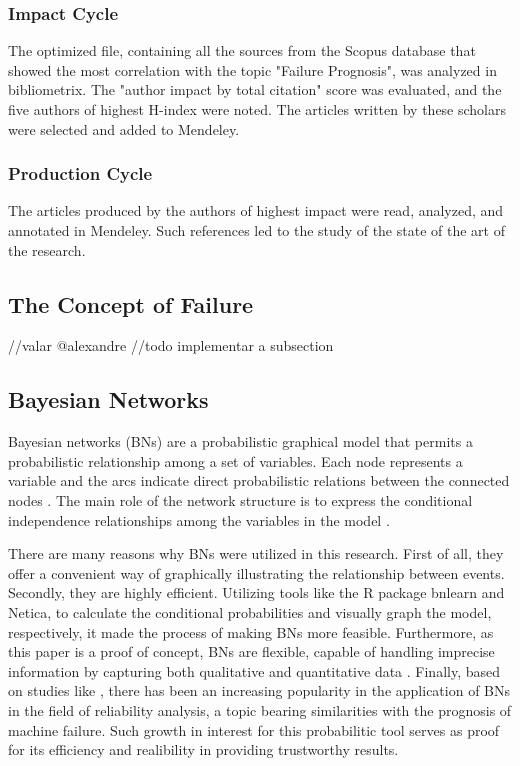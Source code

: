\subsubsection{Impact Cycle}
The optimized file, containing all the sources from the Scopus database that showed the most correlation with the topic "Failure Prognosis", was analyzed in bibliometrix. 
The "author impact by total citation" score was evaluated, and the five authors of highest H-index were noted. The articles written by these scholars were selected and added to Mendeley.

\subsubsection{Production Cycle}
The articles produced by the authors of highest impact were read, analyzed, and annotated in Mendeley.
Such references led to the study of the state of the art of the research.

\subsection{The Concept of Failure}
//valar @alexandre
//todo implementar a subsection


\subsection{Bayesian Networks}
Bayesian networks (BNs) are a probabilistic graphical model that  permits  a  probabilistic  relationship  among a set of variables.  Each  node  represents  a  variable  and  the  arcs  indicate  direct probabilistic  relations  between  the  connected  nodes \cite{hamza2015mapping}. The main role of the network structure is to express the conditional independence relationships among the variables in the model \cite{Understa77:online}.

There are many reasons why BNs were utilized in this research. First of all, they offer a convenient way of graphically illustrating the relationship between events. Secondly, they are highly efficient. Utilizing tools like the R package bnlearn and Netica, to calculate the conditional probabilities and visually graph the model, respectively, it made the process of making BNs more feasible. Furthermore, as this paper is a proof of concept, BNs are flexible, capable of handling imprecise information by capturing both qualitative and quantitative data \cite{PowerPoi65:online}. Finally, based on studies like \cite{langseth2007applications}, there has been an increasing popularity in the application of BNs in the field of reliability analysis, a topic bearing similarities with the prognosis of machine failure. Such growth in interest for this probabilitic tool serves as proof for its efficiency and realibility in providing trustworthy results.

